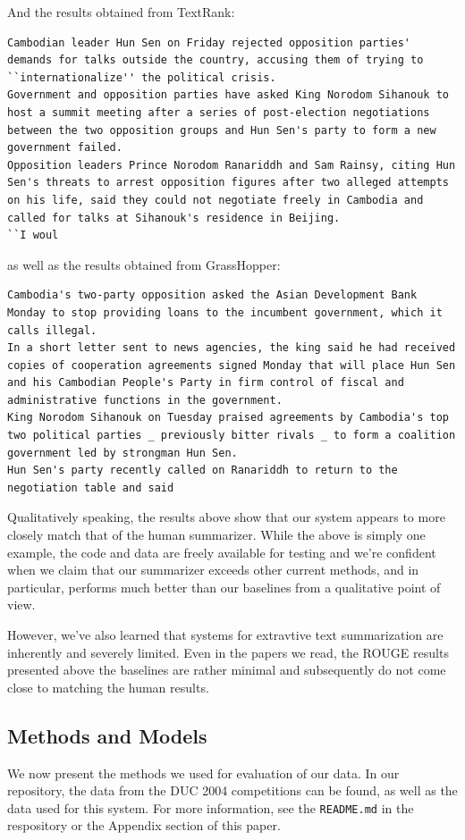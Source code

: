 \documentclass[10pt]{article}
\begin{document}
And the results obtained from TextRank:
\begin{lstlisting}[breaklines]
Cambodian leader Hun Sen on Friday rejected opposition parties' demands for talks outside the country, accusing them of trying to ``internationalize'' the political crisis.
Government and opposition parties have asked King Norodom Sihanouk to host a summit meeting after a series of post-election negotiations between the two opposition groups and Hun Sen's party to form a new government failed.
Opposition leaders Prince Norodom Ranariddh and Sam Rainsy, citing Hun Sen's threats to arrest opposition figures after two alleged attempts on his life, said they could not negotiate freely in Cambodia and called for talks at Sihanouk's residence in Beijing.
``I woul
\end{lstlisting}

as well as the results obtained from GrassHopper:
\begin{lstlisting}[breaklines]
Cambodia's two-party opposition asked the Asian Development Bank Monday to stop providing loans to the incumbent government, which it calls illegal.
In a short letter sent to news agencies, the king said he had received copies of cooperation agreements signed Monday that will place Hun Sen and his Cambodian People's Party in firm control of fiscal and administrative functions in the government.
King Norodom Sihanouk on Tuesday praised agreements by Cambodia's top two political parties _ previously bitter rivals _ to form a coalition government led by strongman Hun Sen.
Hun Sen's party recently called on Ranariddh to return to the negotiation table and said
\end{lstlisting}


Qualitatively speaking, the results above show that our system appears to more closely match that of the human summarizer. While the above is simply one example, the code and data are freely available for testing and we're confident when we claim that our summarizer exceeds other current methods, and in particular, performs much better than our baselines from a qualitative point of view.

However, we've also learned that systems for extravtive text summarization are inherently and severely limited. Even in the papers we read, the ROUGE results presented above the baselines are rather minimal and subsequently do not come close to matching the human results.

\subsection{Methods and Models}
We now present the methods we used for evaluation of our data. In our repository, the data from the DUC 2004 competitions can be found, as well as the data used for this system. For more information, see the \verb|README.md| in the respository or the Appendix section of this paper.
\end{document}
